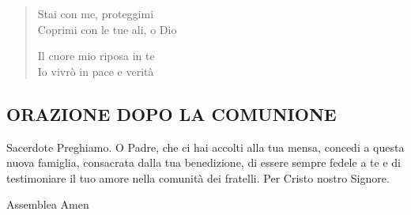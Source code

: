 \begin{verse}
\begin{mystrofe}
Stai con me, proteggimi \\
Coprimi con le tue ali, o Dio \\
\end{mystrofe}


\begin{mystrofe}
Il cuore mio riposa in te \\
Io vivrò in pace e verità \\
\end{mystrofe}

\end{verse}

\subsection*{ORAZIONE DOPO LA COMUNIONE}

\begin{dialoghi}
\item[Sacerdote] Preghiamo. O Padre, che ci hai accolti alla tua mensa, concedi a questa nuova famiglia, consacrata dalla tua benedizione, di essere sempre fedele a te e di testimoniare il tuo amore nella comunità dei fratelli. Per Cristo nostro Signore.
\item[Assemblea] Amen
\end{dialoghi}
